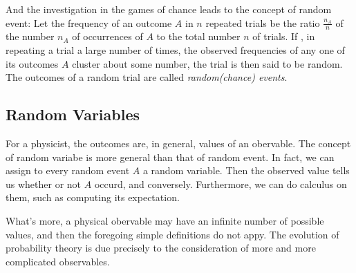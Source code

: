 \documentclass[a4paper]{article}
\begin{document}
And the investigation in the games of chance leads to the concept of
random event: Let the frequency of an outcome $A$ in $n$ repeated
trials be the ratio $\frac{n_A}{n}$ of the number $n_A$ of occurrences
of $A$ to the total number $n$ of trials. If , in repeating a trial a
large number of times, the observed frequencies of any one of its
outcomes $A$ cluster about some number, the trial is then said to be
random. The outcomes of a random trial are called \textit{random(chance)
events}.\cite{1977probability}

\subsection{Random Variables}

For a physicist, the outcomes are, in general, values of an obervable.
The concept of random variabe is more general than that of random event.
In fact, we can assign to every random event $A$ a random variable. Then
the observed value tells us whether or not $A$ occurd, and conversely.
Furthermore, we can do calculus on them, such as computing its
expectation.\cite{1977probability}

What's more, a physical obervable may have an infinite number of
possible values, and then the foregoing simple definitions do not appy.
The evolution of probability theory is due precisely to the
consideration of more and more complicated
observables.\cite{1977probability}








\end{document}
